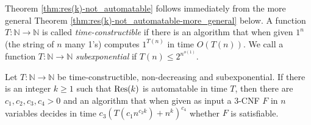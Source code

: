 Theorem \ref{thm:res(k)-not_automatable} follows immediately from the more general Theorem \ref{thm:res(k)-not_automatable-more_general} below. A function $T: \mathbb{N} \rightarrow \mathbb{N}$ is called \emph{time-constructible} if there is an algorithm that when given $1^n$ (the string of $n$ many 1's) computes $1^{T(n)}$ in time $O(T(n))$. We call a function $T: \mathbb{N} \rightarrow \mathbb{N}$ \emph{subexponential} if $T(n) \leq 2^{n^{o(1)}}$. 

\begin{theorem}
\label{thm:res(k)-not_automatable-more_general}
Let $T: \mathbb{N} \rightarrow \mathbb{N}$ be time-constructible, non-decreasing and subexponential. 
If there is an integer $k \geq 1$ such that $\textnormal{Res}(k)$ is automatable in time $T$, then there are $c_1, c_2, c_3, c_4 > 0$ and an algorithm that when given as input a 3-CNF $F$ in $n$ variables decides in time $c_3 (T(c_1 n^{c_2 k}) + n^{k})^{c_4}$ whether $F$ is satisfiable.
\end{theorem}

